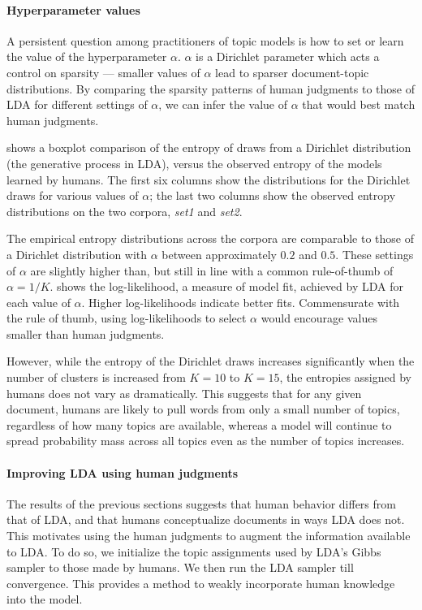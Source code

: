 \paragraph{Hyperparameter values} A persistent question among
practitioners of topic models is how to set or learn the value of the
hyperparameter $\alpha$.  $\alpha$ is a Dirichlet parameter which acts
a control on sparsity --- smaller values of $\alpha$ lead to sparser
document-topic distributions.  By comparing the sparsity patterns of
human judgments to those of LDA for different settings of $\alpha$, we
can infer the value of $\alpha$ that would best match human judgments.

 shows a boxplot comparison of the entropy of draws
from a Dirichlet distribution (the generative process in LDA), versus
the observed entropy of the models learned by humans.  The first six
columns show the distributions for the Dirichlet draws for various
values of $\alpha$; the last two columns show the observed entropy
distributions on the two corpora, \emph{set1} and \emph{set2}.

The empirical entropy distributions across the corpora are comparable
to those of a Dirichlet distribution with $\alpha$ between
approximately $0.2$ and $0.5$.  These settings of $\alpha$ are
slightly higher than, but still in line with a common rule-of-thumb of
$\alpha = 1 / K$.   shows the log-likelihood, a measure
of model fit, achieved by LDA for each value of $\alpha$.  Higher
log-likelihoods indicate better fits.  Commensurate with the rule of
thumb, using log-likelihoods to select $\alpha$ would encourage values
smaller than human judgments.

However, while the entropy of the Dirichlet draws increases
significantly when the number of clusters is increased from $K=10$ to
$K=15$, the entropies assigned by humans does not vary as
dramatically.  This suggests that for any given document, humans are
likely to pull words from only a small number of topics, regardless of
how many topics are available, whereas a model will continue to spread
probability mass across all topics even as the number of topics
increases.

\paragraph{Improving LDA using human judgments} The results of the
previous sections suggests that human behavior differs from that of
LDA, and that humans conceptualize documents in ways LDA does
not. This motivates using the human judgments to augment the
information available to LDA.  To do so, we initialize the topic
assignments used by LDA's Gibbs sampler to those made by humans.  We
then run the LDA sampler till convergence.  This provides a method to
weakly incorporate human knowledge into the model.

